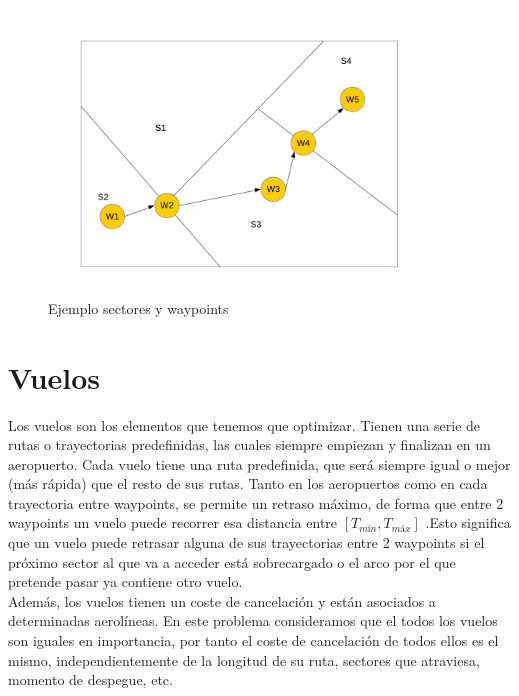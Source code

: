 \begin{figure}[H]
	\begin{center}
		\centering
		\includegraphics[width=0.9\textwidth]{./imagenes/descripcion_problema/sectoresYWaypoints.jpg}
		\caption{Ejemplo sectores y waypoints}
		\label{fig: Ejemplo sectores y waypoints}
	\end{center}
\end{figure}

\section{Vuelos}
Los vuelos son los elementos que tenemos que optimizar. Tienen una serie de rutas o trayectorias predefinidas, las cuales siempre empiezan y finalizan en un aeropuerto. Cada vuelo tiene una ruta predefinida, que será siempre igual o mejor (más rápida) que el resto de sus rutas. Tanto en los aeropuertos como en cada trayectoria entre waypoints, se permite un retraso máximo, de forma que entre 2 waypoints un vuelo puede recorrer esa distancia entre $[T_{mín}, T_{máx}]$ .Esto significa que un vuelo puede retrasar alguna de sus trayectorias entre 2 waypoints si el próximo sector al que va a acceder está sobrecargado o el arco por el que pretende pasar ya contiene otro vuelo.\\

Además, los vuelos tienen un coste de cancelación y están asociados a determinadas aerolíneas. En este problema consideramos que el todos los vuelos son iguales en importancia, por tanto el coste de cancelación de todos ellos es el mismo, independientemente de la longitud de su ruta, sectores que atraviesa, momento de despegue, etc.\\

